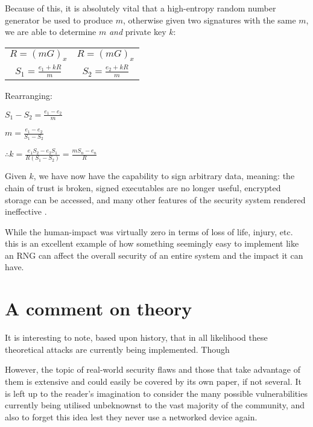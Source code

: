     Because of this, it is absolutely vital that a high-entropy random number generator be used to produce $m$, otherwise given two signatures with the same $m$, we are able to determine $m$ \emph{and} private key $k$:
    
    \begin{center}
        \begin{tabular}{ c c }
          $R = (mG)_x$ & $R = (mG)_x$ \\
          $S_1 = \frac{e_1+kR}{m}$ & $S_2 = \frac{e_2+kR}{m}$
        \end{tabular}
    \end{center}
    
    Rearranging:
    \begin{center}
    	$S_1 - S_2 = \frac{e_1-e_2}{m}$
    
    	$m = \frac{e_1-e_2}{S_1-S_2}$
    
    	$\therefore k = \frac{e_1S_2-e_2S_1}{R(S_1-S_2)} = \frac{mS_n-e_n}{R}  $
    \end{center}
    
    Given $k$, we have now have the capability to sign arbitrary data, meaning: the chain of trust is broken, signed executables are no longer useful, encrypted storage can be accessed, and many other features of the security system rendered ineffective \cite{Bushing:2010qs}.
    
    While the human-impact was virtually zero in terms of loss of life, injury, etc. this is an excellent example of how something seemingly easy to implement like an RNG can affect the overall security of an entire system and the impact it can have.

\section{A comment on theory}

It is interesting to note, based upon history, that in all likelihood these theoretical attacks are currently being implemented. Though 

However, the topic of real-world security flaws and those that take advantage of them is extensive and could easily be covered by its own paper, if not several. It is left up to the reader's imagination to consider the many possible vulnerabilities currently being utilised unbeknownst to the vast majority of the community, and also to forget this idea lest they never use a networked device again.